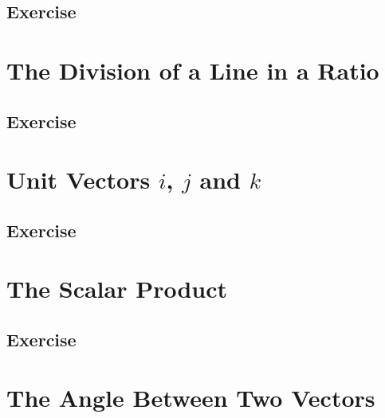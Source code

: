 \documentclass[
  11pt,
  openany]{book}
\begin{document}
\subsection*{Exercise}\label{exercise-37}

\newpage

\section{The Division of a Line in a Ratio}\label{the-division-of-a-line-in-a-ratio}

\newpage

\subsection*{Exercise}\label{exercise-38}

\newpage

\section{\texorpdfstring{Unit Vectors \(i\), \(j\) and \(k\)}{Unit Vectors i, j and k}}\label{unit-vectors-i-j-and-k}

\newpage

\subsection*{Exercise}\label{exercise-39}

\newpage

\section{The Scalar Product}\label{the-scalar-product}

\newpage

\subsection*{Exercise}\label{exercise-40}

\newpage

\section{The Angle Between Two Vectors}\label{the-angle-between-two-vectors}
\end{document}

